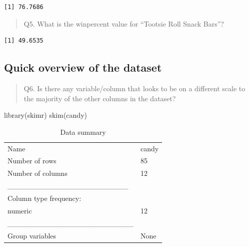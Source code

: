 \documentclass[
  letterpaper,
  DIV=11,
  numbers=noendperiod]{scrartcl}
\newenvironment{Shaded}{\begin{snugshade}}{\end{snugshade}}
\newcommand{\FunctionTok}[1]{\textcolor[rgb]{0.28,0.35,0.67}{#1}}
\newcommand{\NormalTok}[1]{\textcolor[rgb]{0.00,0.23,0.31}{#1}}
\newcommand{\SpecialCharTok}[1]{\textcolor[rgb]{0.37,0.37,0.37}{#1}}
\newcommand{\StringTok}[1]{\textcolor[rgb]{0.13,0.47,0.30}{#1}}
\begin{document}
\begin{verbatim}
[1] 76.7686
\end{verbatim}

\begin{quote}
Q5. What is the winpercent value for ``Tootsie Roll Snack Bars''?
\end{quote}

\begin{Shaded}
\end{Shaded}

\begin{verbatim}
[1] 49.6535
\end{verbatim}

\subsection{Quick overview of the
dataset}\label{quick-overview-of-the-dataset}

\begin{quote}
Q6. Is there any variable/column that looks to be on a different scale
to the majority of the other columns in the dataset?
\end{quote}

\begin{Shaded}
\begin{Highlighting}[]
\FunctionTok{library}\NormalTok{(skimr)}
\FunctionTok{skim}\NormalTok{(candy)}
\end{Highlighting}
\end{Shaded}

\begin{longtable}[]{@{}ll@{}}
\caption{Data summary}\tabularnewline
\toprule\noalign{}
\endfirsthead
\endhead
\bottomrule\noalign{}
\endlastfoot
Name & candy \\
Number of rows & 85 \\
Number of columns & 12 \\
\_\_\_\_\_\_\_\_\_\_\_\_\_\_\_\_\_\_\_\_\_\_\_ & \\
Column type frequency: & \\
numeric & 12 \\
\_\_\_\_\_\_\_\_\_\_\_\_\_\_\_\_\_\_\_\_\_\_\_\_ & \\
Group variables & None \\
\end{longtable}
\end{document}
